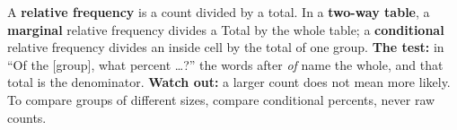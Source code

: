 \documentclass[12pt]{article}
\begin{document}
\vspace{0.14in}

\begin{remindbox}
\small
A \textbf{relative frequency} is a count divided by a total. In a \textbf{two-way table}, a
\textbf{marginal} relative frequency divides a Total by the whole table; a \textbf{conditional}
relative frequency divides an inside cell by the total of one group. \textbf{The test:} in ``Of
the [group], what percent \ldots?'' the words after \emph{of} name the whole, and that total is
the denominator. \textbf{Watch out:} a larger count does not mean more likely. To compare groups
of different sizes, compare conditional percents, never raw counts.
\end{remindbox}
\end{document}
